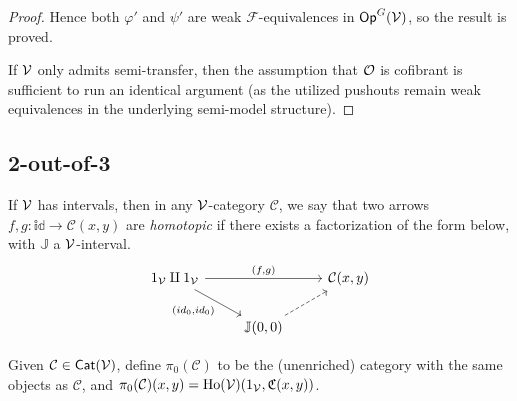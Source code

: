 \documentclass[a4paper,10pt
,draft
]{article}%
\renewcommand{\phi}{\varphi}
\renewcommand{\F}{\mathcal F}
\renewcommand{\1}{\ensuremath{\mathbb{id}}}
\begin{document}
\begin{proof}
      Hence both $\phi'$ and $\psi'$ are weak $\F$-equivalences in $\mathsf{Op}^G(\mathcal V)$, so the result is proved.

      If $\mathcal V$ only admits semi-transfer, then the assumption that $\mathcal{O}$ is cofibrant is sufficient to run an identical argument
      (as the utilized pushouts remain weak equivalences in the underlying semi-model structure).
\end{proof}


\subsection{2-out-of-3}


\begin{definition}
      If $\mathcal V$ has intervals, then in any $\mathcal V$-category $\mathcal C$,
      we say that two arrows  $f,g: \1 \to \mathcal C(x,y)$ are \textit{homotopic}
      if there exists a factorization of the form below, with $\mathbb J$ a $\mathcal V$-interval.
      \begin{equation}
            \begin{tikzcd}
                  1_\V \amalg 1_\V \arrow[rr, "{(f, g)}"] \arrow[dr, "{(id_0,id_0)}"']
                  &&
                  \mathcal C(x,y)
                  \\
                  &
                  \mathbb J(0,0) \arrow[ur, dashed]
            \end{tikzcd}
      \end{equation}

      Given $\mathcal C \in \mathsf{Cat}(\mathcal V)$, define $\pi_0(\mathcal C)$ to be the (unenriched) category with
      the same objects as $\mathcal C$, and $\pi_0(\mathcal C)(x,y) = \operatorname{Ho}(\mathcal V)(1_{\mathcal V}, \mathfrak C(x,y))$.
\end{definition}
\end{document}
